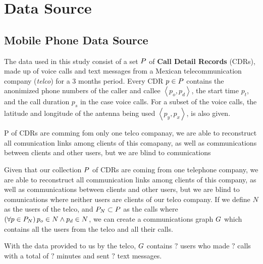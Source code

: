 \section{Data Source}

\subsection{Mobile Phone Data Source}

The data used in this study consist of a set \( \mathlarger{P} \) of \textbf{Call Detail Records} (CDRs), made up of voice calls and text messages from a Mexican telecommunication company (\textit{telco}) for a 3 months period.
Every CDR \( p \in \mathlarger{P} \)  contains the anonimized phone numbers of the caller and callee \( \left< p_o, p_d \right> \), the start time \( p_t \), and the call duration \( p_s \) in the case voice calls. 
For a subset of the voice calls, the latitude and longitude of the antenna being used \( \left< p_y, p_x \right> \), is also given.

 P of CDRs are comming fom only one telco companay, we are able to reconstruct all comunication links among clients of this comapany, as well as communications between clients and other users, but we are blind to comunications 

Given that our collection \( \mathlarger{P} \) of CDRs are
coming from one telephone company, 
we are able to reconstruct all communication links among clients of this company, as well as communications between clients and other users, but we are blind to comunications where neither users are clients of our telco company.
If we define \( N \) as the users of the telco, and \( \mathlarger{P}_N \subset \mathlarger{P} \) as the calls where \( \left( \forall p \in \mathlarger{P}_N \right) p_o \in N \wedge p_d \in N \), we can create a communications graph \( \mathlarger{G} \) which contains all the users from the telco and all their calls.

With the data provided to us by the telco, \( \mathlarger{G} \) contains \( ? \) users who made \( ? \) calls with a total of \( ? \) minutes and sent \( ? \) text messages.

